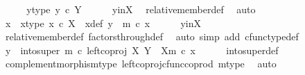 \begin{isabellebody}
%
\isadelimproof
%
\endisadelimproof
%
\isatagproof
{}\isamarkupfalse%
\ {\isacharminus}{\kern0pt}\isanewline
\ \ \isamarkupfalse%
\ y{\isacharunderscore}{\kern0pt}type{\isacharcolon}{\kern0pt}\ {\isachardoublequoteopen}y\ {\isasymin}\isactrlsub c\ Y{\isachardoublequoteclose}\isanewline
\ \ \ \ \isamarkupfalse%
\ y{\isacharunderscore}{\kern0pt}in{\isacharunderscore}{\kern0pt}X\ \isamarkupfalse%
\ relative{\isacharunderscore}{\kern0pt}member{\isacharunderscore}{\kern0pt}def{}\ \isamarkupfalse%
\ auto\isanewline
\ \ \isamarkupfalse%
\ x\ \ x{\isacharunderscore}{\kern0pt}type{\isacharcolon}{\kern0pt}\ {\isachardoublequoteopen}x\ {\isasymin}\isactrlsub c\ X{\isachardoublequoteclose}\ \ x{\isacharunderscore}{\kern0pt}def{\isacharcolon}{\kern0pt}\ {\isachardoublequoteopen}y\ {\isacharequal}{\kern0pt}\ m\ {\isasymcirc}\isactrlsub c\ x{\isachardoublequoteclose}\isanewline
\ \ \ \ \isamarkupfalse%
\ y{\isacharunderscore}{\kern0pt}in{\isacharunderscore}{\kern0pt}X\ \isamarkupfalse%
\ relative{\isacharunderscore}{\kern0pt}member{\isacharunderscore}{\kern0pt}def{}\ factors{\isacharunderscore}{\kern0pt}through{\isacharunderscore}{\kern0pt}def\ \isamarkupfalse%
\ {\isacharparenleft}{\kern0pt}auto\ simp\ add{\isacharcolon}{\kern0pt}\ cfunc{\isacharunderscore}{\kern0pt}type{\isacharunderscore}{\kern0pt}def{\isacharparenright}{\kern0pt}\isanewline
\ \ \isamarkupfalse%
\ \isamarkupfalse%
\ {\isachardoublequoteopen}y\ {\isacharequal}{\kern0pt}\ {\isacharparenleft}{\kern0pt}into{\isacharunderscore}{\kern0pt}super\ m\ {\isasymcirc}\isactrlsub c\ left{\isacharunderscore}{\kern0pt}coproj\ X\ {\isacharparenleft}{\kern0pt}Y\ {\isasymsetminus}\ {\isacharparenleft}{\kern0pt}X{\isacharcomma}{\kern0pt}m{\isacharparenright}{\kern0pt}{\isacharparenright}{\kern0pt}{\isacharparenright}{\kern0pt}\ {\isasymcirc}\isactrlsub c\ x{\isachardoublequoteclose}\isanewline
\ \ \ \ \isamarkupfalse%
\ into{\isacharunderscore}{\kern0pt}super{\isacharunderscore}{\kern0pt}def\ \isamarkupfalse%
\ complement{\isacharunderscore}{\kern0pt}morphism{\isacharunderscore}{\kern0pt}type\ left{\isacharunderscore}{\kern0pt}coproj{\isacharunderscore}{\kern0pt}cfunc{\isacharunderscore}{\kern0pt}coprod\ m{\isacharunderscore}{\kern0pt}type\ \isamarkupfalse%
\ auto\isanewline
\ \ \isamarkupfalse%
\ \isamarkupfalse%

\end{isabellebody}

